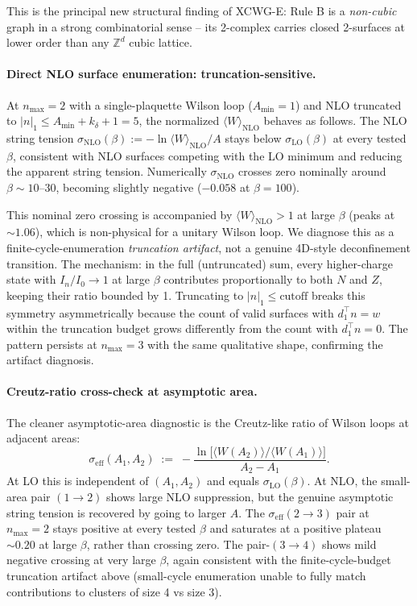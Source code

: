 \documentclass[11pt]{article}
\begin{document}
This is the principal new structural finding of XCWG-E: Rule B is a
\emph{non-cubic} graph in a strong combinatorial sense -- its 2-complex
carries closed 2-surfaces at lower order than any $\mathbb{Z}^d$ cubic
lattice.

\paragraph{Direct NLO surface enumeration: truncation-sensitive.} At
$n_\text{max}=2$ with a single-plaquette Wilson loop ($A_\text{min}=1$) and
NLO truncated to $|n|_1\le A_\text{min}+k_\delta+1=5$, the normalized
$\langle W\rangle_\text{NLO}$ behaves as follows. The NLO string tension
$\sigma_\text{NLO}(\beta):=-\ln\langle W\rangle_\text{NLO}/A$ stays below
$\sigma_\text{LO}(\beta)$ at every tested $\beta$, consistent with NLO
surfaces competing with the LO minimum and reducing the apparent string
tension. Numerically $\sigma_\text{NLO}$ crosses zero nominally around
$\beta\sim 10$--$30$, becoming slightly negative ($-0.058$ at $\beta=100$).

This nominal zero crossing is accompanied by $\langle W\rangle_\text{NLO}>1$
at large $\beta$ (peaks at $\sim 1.06$), which is non-physical for a unitary
Wilson loop. We diagnose this as a finite-cycle-enumeration \emph{truncation
artifact}, not a genuine 4D-style deconfinement transition. The mechanism:
in the full (untruncated) sum, every higher-charge state with
$I_n/I_0\to 1$ at large $\beta$ contributes proportionally to both $N$ and
$Z$, keeping their ratio bounded by 1. Truncating to $|n|_1\le\text{cutoff}$
breaks this symmetry asymmetrically because the count of valid surfaces
with $d_1^\top n=w$ within the truncation budget grows differently from the
count with $d_1^\top n=0$. The pattern persists at $n_\text{max}=3$ with the
same qualitative shape, confirming the artifact diagnosis.

\paragraph{Creutz-ratio cross-check at asymptotic area.} The cleaner
asymptotic-area diagnostic is the Creutz-like ratio of Wilson loops at
adjacent areas:
\begin{equation}
\sigma_\text{eff}(A_1,A_2)\;:=\;
-\frac{\ln\!\bigl[\langle W(A_2)\rangle/\langle W(A_1)\rangle\bigr]}{A_2-A_1}.
\end{equation}
At LO this is independent of $(A_1,A_2)$ and equals $\sigma_\text{LO}(\beta)$.
At NLO, the small-area pair $(1\to 2)$ shows large NLO suppression, but the
genuine asymptotic string tension is recovered by going to larger $A$. The
$\sigma_\text{eff}(2\to 3)$ pair at $n_\text{max}=2$ stays positive at every
tested $\beta$ and saturates at a positive plateau $\sim 0.20$ at large
$\beta$, rather than crossing zero. The pair-$(3\to 4)$ shows mild negative
crossing at very large $\beta$, again consistent with the finite-cycle-budget
truncation artifact above (small-cycle enumeration unable to fully match
contributions to clusters of size 4 vs size 3).
\end{document}

